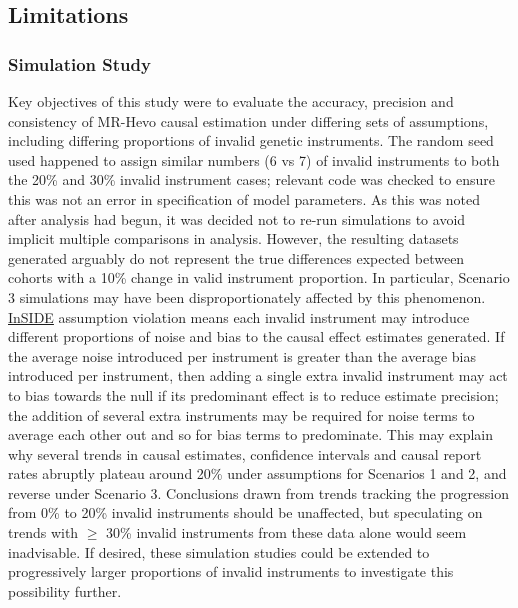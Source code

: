 \documentclass[
]{article}
\begin{document}
\subsection{Limitations}\label{limitations}

\subsubsection{Simulation Study}\label{lim-sim}

Key objectives of this study were to evaluate the accuracy, precision and consistency of MR-Hevo causal estimation under differing sets of assumptions, including differing proportions of invalid genetic instruments. The random seed used happened to assign similar numbers (6 vs 7) of invalid instruments to both the 20\% and 30\% invalid instrument cases; relevant code was checked to ensure this was not an error in specification of model parameters. As this was noted after analysis had begun, it was decided not to re-run simulations to avoid implicit multiple comparisons in analysis. However, the resulting datasets generated arguably do not represent the true differences expected between cohorts with a 10\% change in valid instrument proportion. In particular, Scenario 3 simulations may have been disproportionately affected by this phenomenon. \hyperref[acronyms_InSIDE]{InSIDE} assumption violation means each invalid instrument may introduce different proportions of noise and bias to the causal effect estimates generated. If the average noise introduced per instrument is greater than the average bias introduced per instrument, then adding a single extra invalid instrument may act to bias towards the null if its predominant effect is to reduce estimate precision; the addition of several extra instruments may be required for noise terms to average each other out and so for bias terms to predominate. This may explain why several trends in causal estimates, confidence intervals and causal report rates abruptly plateau around 20\% under assumptions for Scenarios 1 and 2, and reverse under Scenario 3. Conclusions drawn from trends tracking the progression from 0\% to 20\% invalid instruments should be unaffected, but speculating on trends with \(\ge\) 30\% invalid instruments from these data alone would seem inadvisable. If desired, these simulation studies could be extended to progressively larger proportions of invalid instruments to investigate this possibility further.
\end{document}
